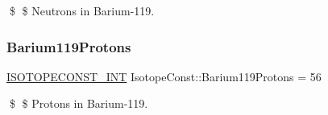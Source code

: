 \$ \$ Neutrons in Barium-\/119. \mbox{\label{group___isotope_const-_barium-_ba119_gafa11d63b97d25cbbd494594cc46e9c9e}} 
\subsubsection{\texorpdfstring{Barium119\+Protons}{Barium119Protons}}
{\footnotesize\ttfamily \mbox{\hyperlink{group___isotope_const-_macros_ga5f18360b3e99483a35c32d789e62621c}{I\+S\+O\+T\+O\+P\+E\+C\+O\+N\+S\+T\+\_\+\+I\+NT}} Isotope\+Const\+::\+Barium119\+Protons = 56}

\$ \$ Protons in Barium-\/119. 